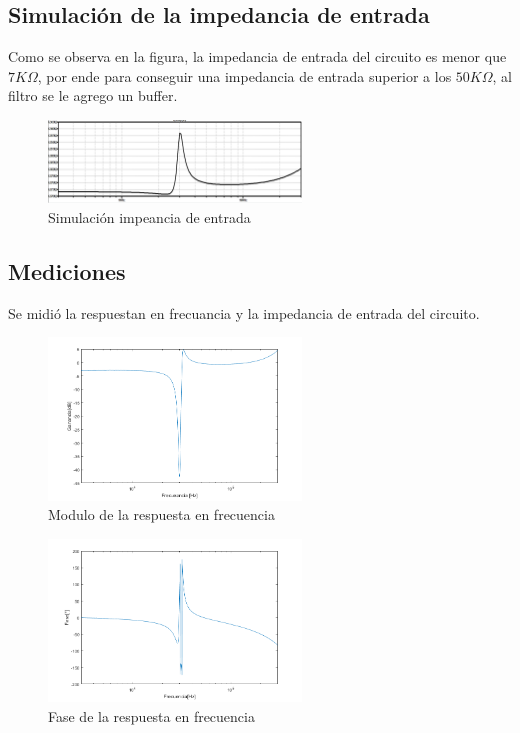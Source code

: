 \documentclass[../../tc_tp5_main.tex]{subfiles}
\begin{document}
\subsection{Simulación de la impedancia de entrada}
Como se observa en la figura, la impedancia de entrada del circuito es menor que $7K\Omega$, por ende para conseguir una impedancia de entrada superior a los $50K\Omega$, al filtro se le agrego un buffer.
\begin{figure}[H]	
	\centering
	\includegraphics[width=0.6\textwidth]{imagenes/zinsim.png}
	\caption{Simulación impeancia de entrada}
\end{figure}
\subsection{Mediciones}

Se midió la respuestan en frecuancia y la impedancia de entrada del circuito.

\begin{figure}[H]	
	\centering
	\includegraphics[width=0.6\textwidth]{imagenes/mag.png}
	\caption{Modulo de la respuesta en frecuencia}
\end{figure}

\begin{figure}[H]	
	\centering
	\includegraphics[width=0.6\textwidth]{imagenes/fase.png}
	\caption{Fase de la respuesta en frecuencia}
\end{figure}
\end{document}
